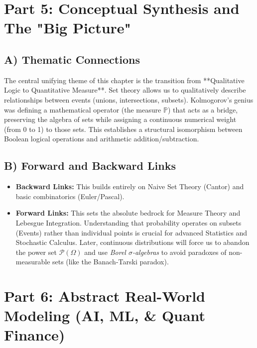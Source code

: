 \documentclass[11pt]{article}
\begin{document}
\section{Part 5: Conceptual Synthesis and The "Big Picture"}

\subsection{A) Thematic Connections}
The central unifying theme of this chapter is the transition from **Qualitative Logic to Quantitative Measure**. Set theory allows us to qualitatively describe relationships between events (unions, intersections, subsets). Kolmogorov's genius was defining a mathematical operator (the measure $\mathbb{P}$) that acts as a bridge, preserving the algebra of sets while assigning a continuous numerical weight (from 0 to 1) to those sets. This establishes a structural isomorphism between Boolean logical operations and arithmetic addition/subtraction.

\subsection{B) Forward and Backward Links}
\begin{itemize}
    \item \textbf{Backward Links:} This builds entirely on Naive Set Theory (Cantor) and basic combinatorics (Euler/Pascal). 
    \item \textbf{Forward Links:} This sets the absolute bedrock for Measure Theory and Lebesgue Integration. Understanding that probability operates on subsets (Events) rather than individual points is crucial for advanced Statistics and Stochastic Calculus. Later, continuous distributions will force us to abandon the power set $\mathcal{P}(\Omega)$ and use \textit{Borel $\sigma$-algebras} to avoid paradoxes of non-measurable sets (like the Banach-Tarski paradox).
\end{itemize}

\section{Part 6: Abstract Real-World Modeling (AI, ML, \& Quant Finance)}
\end{document}
